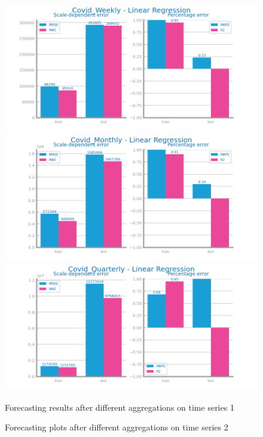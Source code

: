 \documentclass[10pt]{extarticle}
\begin{document}
\begin{figure}[H]
\centering\includegraphics[scale=0.5]{images/dataset1/time_series/Covid_Weekly - Linear Regression_forecasting_eval.png}
\includegraphics[scale=0.5]{images/dataset1/time_series/Covid_Monthly - Linear Regression_forecasting_eval.png}
\includegraphics[scale=0.5]{images/dataset1/time_series/Covid_Quarterly - Linear Regression_forecasting_eval.png}
\caption{Forecasting results after different aggregations on time series 1}
\end{figure}

\begin{figure}[H]
\caption{Forecasting plots after different aggregations on time series 2}
\end{figure}
\end{document}

